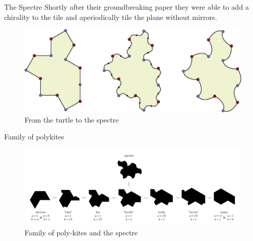 \documentclass{beamer}
\begin{document}
\begin{frame}{The Spectre}
    Shortly after their groundbreaking paper they were able to add a chirality to the tile and aperiodically tile the plane without mirrors.
    \begin{figure}
        \centering
        \includegraphics[width=\linewidth]{images/aperiodic-pdfs/polygon_to_spectre.pdf}
        \caption{From the turtle to the spectre}
        \label{fig:turle-spectra}
    \end{figure}
\end{frame}

\begin{frame}{Family of polykites}
    \begin{figure}
        \centering
        \includegraphics[width=\textwidth]{images/polykite-family/monotile-continuum.png}
        \caption{Family of poly-kites and the spectre}
        \label{fig:poly-kites-spectre}
    \end{figure}
\end{frame}

%     
\end{document}
